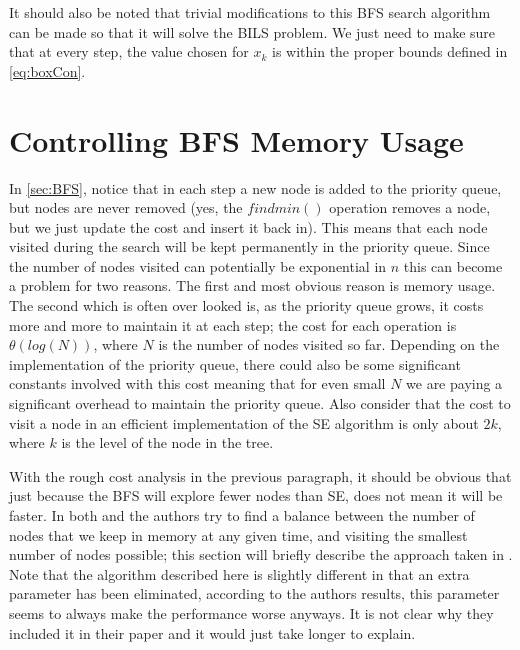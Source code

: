 \documentclass[12pt,Bold,letterpaper]{mcgilletdclass}
\newcommand{\vsp}{\vspace{\baselineskip}}
\begin{document}
It should also be noted that trivial modifications to this BFS search algorithm can be made so that it will solve the BILS problem. We just need to make sure that at every step, the value chosen for $x_k$ is within the proper bounds defined in \ref{eq:boxCon}.

\vsp \section{Controlling BFS Memory Usage}

In \ref{sec:BFS}, notice that in each step a new node is added to the priority queue, but nodes are never removed (yes, the $findmin()$ operation removes a node, but we just update the cost and insert it back in). This means that each node visited during the search will be kept permanently in the priority queue. Since the number of nodes visited can potentially be exponential in $n$ this can become a problem for two reasons. The first and most obvious reason is memory usage. The second which is often over looked is, as the priority queue grows, it costs more and more to maintain it at each step; the cost for each operation is $\theta(log(N))$, where $N$ is the number of nodes visited so far. Depending on the implementation of the priority queue, there could also be some significant constants involved with this cost meaning that for even small $N$ we are paying a significant overhead to maintain the priority queue. Also consider that the cost to visit a node in an efficient implementation of the SE algorithm is only about $2k$, where $k$ is the level of the node in the tree.

With the rough cost analysis in the previous paragraph, it should be obvious that just because the BFS will explore fewer nodes than SE, does not mean it will be faster. In both \cite{DaiY08} and \cite{StuBF07} the authors try to find a balance between the number of nodes that we keep in memory at any given time, and visiting the smallest number of nodes possible; this section will briefly describe the approach taken in \cite{StuBF07}. Note that the algorithm described here is slightly different in that an extra parameter has been eliminated, according to the authors results, this parameter seems to always make the performance worse anyways. It is not clear why they included it in their paper and it would just take longer to explain.
\end{document}
